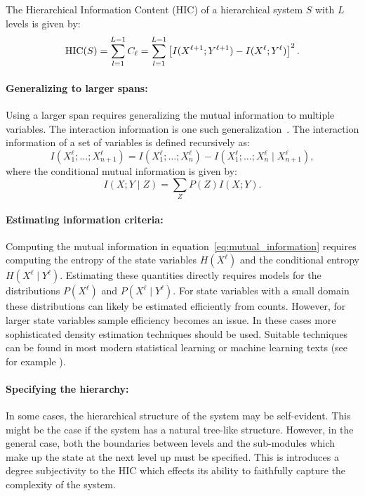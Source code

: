 \begin{definition}
\label{def:hic}
  The Hierarchical Information Content (HIC) of a hierarchical system $S$ with
  $L$ levels is given by:
  \begin{equation}
    \label{eq:hic}
    \textup{HIC}(S) = \sum_{l=1}^{L-1} C_\ell = \sum_{l=1}^{L-1} \left[ I(X^{\ell+1}; Y^{\ell+1}) - I(X^\ell; Y^\ell) \right]^2.
  \end{equation}
\end{definition}

\paragraph{Generalizing to larger spans:} Using a larger span requires
generalizing the mutual information to multiple variables. The interaction
information is one such generalization~\citep{mcgill1954multivariate}. The
interaction information of a set of variables is defined recursively as:
\begin{equation}
    \label{eq:interaction_information}
    I(X_1^\ell; \ldots; X_{n+1}^\ell) = I(X_1^\ell; \ldots; X_n^\ell) - I(X_1^\ell; \ldots; X_n^\ell \mid X_{n+1}^\ell),
\end{equation}
where the conditional mutual information is given by:
\begin{equation}
    \label{eq:conditional_mutual_information}
    I(X; Y \mid Z) = \sum_{Z} P(Z) I(X; Y).
\end{equation}

\paragraph{Estimating information criteria:} Computing the mutual information
in equation~\ref{eq:mutual_information} requires computing the entropy of the
state variables $H(X^\ell)$ and the conditional entropy $H(X^\ell \mid
Y^\ell)$. Estimating these quantities directly requires models for the
distributions $P(X^\ell)$ and $P(X^\ell \mid Y^\ell)$. For state variables with
a small domain these distributions can likely be estimated efficiently from
counts. However, for larger state variables sample efficiency becomes an issue.
In these cases more sophisticated density estimation techniques should be used.
Suitable techniques can be found in most modern statistical learning or machine
learning texts (see for example \citet{friedman2001elements}).

\paragraph{Specifying the hierarchy:} In some cases, the hierarchical structure
of the system may be self-evident. This might be the case if the system has a
natural tree-like structure. However, in the general case, both the boundaries
between levels and the sub-modules which make up the state at the next level up
must be specified. This is introduces a degree subjectivity to the HIC which
effects its ability to faithfully capture the complexity of the system.

